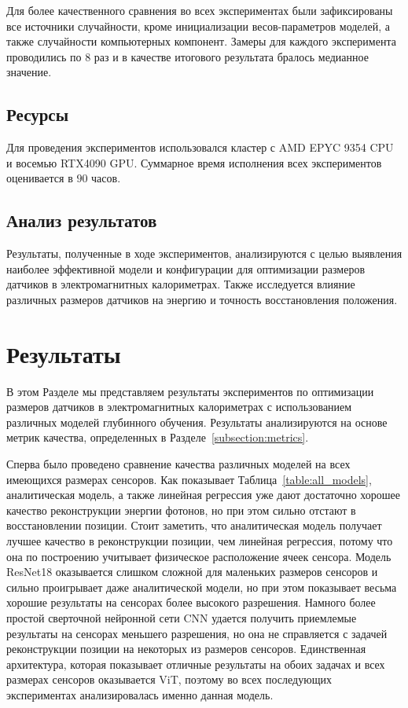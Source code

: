 \documentclass[a4paper,12pt]{extarticle}
\begin{document}
Для более качественного сравнения во всех экспериментах были зафиксированы все источники случайности, кроме инициализации весов-параметров моделей, а также случайности компьютерных компонент. Замеры для каждого эксперимента проводились по $8$ раз и в качестве итогового результата бралось медианное значение.

\subsection{Ресурсы}

Для проведения экспериментов использовался кластер с AMD EPYC 9354 CPU и восемью RTX4090 GPU. Суммарное время исполнения всех экспериментов оценивается в $90$ часов.

\subsection{Анализ результатов}

Результаты, полученные в ходе экспериментов, анализируются с целью выявления наиболее эффективной модели и конфигурации для оптимизации размеров датчиков в электромагнитных калориметрах. Также исследуется влияние различных размеров датчиков на энергию и точность восстановления положения.

\section{Результаты}
\label{section:results}

В этом Разделе мы представляем результаты экспериментов по оптимизации размеров датчиков в электромагнитных калориметрах с использованием различных моделей глубинного обучения. Результаты анализируются на основе метрик качества, определенных в Разделе~\ref{subsection:metrics}.

Сперва было проведено сравнение качества различных моделей на всех имеющихся размерах сенсоров. Как показывает Таблица~\ref{table:all_models}, аналитическая модель, а также линейная регрессия уже дают достаточно хорошее качество реконструкции энергии фотонов, но при этом сильно отстают в восстановлении позиции. Стоит заметить, что аналитическая модель получает лучшее качество в реконструкции позиции, чем линейная регрессия, потому что она по построению учитывает физическое расположение ячеек сенсора. Модель \textsf{ResNet18} оказывается слишком сложной для маленьких размеров сенсоров и сильно проигрывает даже аналитической модели, но при этом показывает весьма хорошие результаты на сенсорах более высокого разрешения. Намного более простой сверточной нейронной сети \textsf{CNN} удается получить приемлемые результаты на сенсорах меньшего разрешения, но она не справляется с задачей реконструкции позиции на некоторых из размеров сенсоров. Единственная архитектура, которая показывает отличные результаты на обоих задачах и всех размерах сенсоров оказывается \textsf{ViT}, поэтому во всех последующих экспериментах анализировалась именно данная модель.
\end{document}

